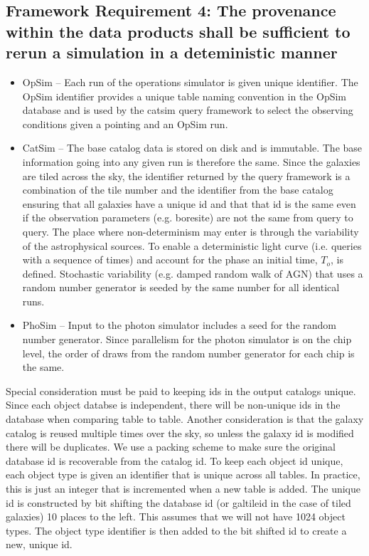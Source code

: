 \documentclass[]{article}
\begin{document}
{\subsection{Framework Requirement 4: The provenance within the data products shall be sufficient to rerun a simulation in a 
deteministic manner}
\begin{itemize}
\item OpSim -- Each run of the operations simulator is given unique identifier.  
The OpSim identifier provides a unique table naming convention in the OpSim database and is used by the catsim
query framework to select the observing conditions given a pointing and an OpSim run.
\item CatSim -- The base catalog data is stored on disk and is immutable. The base information
going into any given run is therefore the same.  Since the galaxies are tiled across the sky, the identifier returned
by the query framework is a combination of the tile number and the identifier from the base catalog ensuring that
all galaxies have a unique id and that that id is the same even if the observation parameters (e.g. boresite) are 
not the same from query to query.  The place where non-determinism may enter is through the variability of the astrophysical
sources.
To enable a deterministic light curve (i.e. queries with a sequence of times) and account for the phase
an initial time, $T_o$, is defined.
Stochastic variability (e.g. damped random walk of AGN) that uses a random number generator is seeded by the same number for all identical runs.
\item PhoSim -- Input to the photon simulator includes a seed for the random number generator.  Since parallelism for
the photon simulator is on the chip level, the order of draws from the random number generator for each chip is the same.
\end{itemize}

Special consideration must be paid to keeping ids in the output catalogs unique.  Since each object databse is independent,
there will be non-unique ids in the database when comparing table to table.  Another consideration is that the galaxy catalog
is reused multiple times over the sky, so unless the galaxy id is modified there will be duplicates.  We use a packing scheme to
make sure the original database id is recoverable from the catalog id.  To keep each object id unique, each object type is given
an identifier that is unique across all tables.  In practice, this is just an integer that is incremented when a new table is added.
The unique id is constructed by bit shifting the database id (or galtileid in the case of tiled galaxies) 10 places to the left.  
This assumes that we will not have 1024 object types.  The object type identifier is then added to the bit shifted id to create
a new, unique id.  

}
\end{document}
